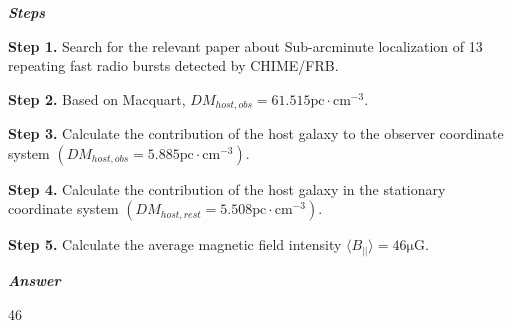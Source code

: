 \begin{tcolorbox}[
    breakable,
    title=Example of Scientific Deep Research in Astronomy,
    colback=LighterGray,
    colframe=DeepPurple,
    colbacktitle=DeepPurple,
    coltitle=White,
]
\textbf{\emph{\textcolor{DeepPurple}{Steps}}}

\textbf{\textcolor{CaseOrange}{Step 1.}} Search for the relevant paper about Sub-arcminute localization of 13 repeating fast radio bursts detected by CHIME/FRB.

\textbf{\textcolor{CaseOrange}{Step 2.}} Based on Macquart, $DM_{host,obs}=61.515 \text{pc} \cdot \text{cm}^{-3}$.

\textbf{\textcolor{CaseOrange}{Step 3.}} Calculate the contribution of the host galaxy to the observer coordinate system $(DM_{host,obs}=5.885  \text{pc} \cdot \text{cm}^{-3})$.

\textbf{\textcolor{CaseOrange}{Step 4.}} Calculate the contribution of the host galaxy in the stationary coordinate system $(DM_{host,rest}=5.508 \text{pc} \cdot \text{cm}^{-3})$.

\textbf{\textcolor{CaseOrange}{Step 5.}} Calculate the average magnetic field intensity $\langle B_{||} \rangle = 46 \mathrm{\mu G}$.

\textbf{\emph{\textcolor{DeepPurple}{Answer}}}

46

\end{tcolorbox}


